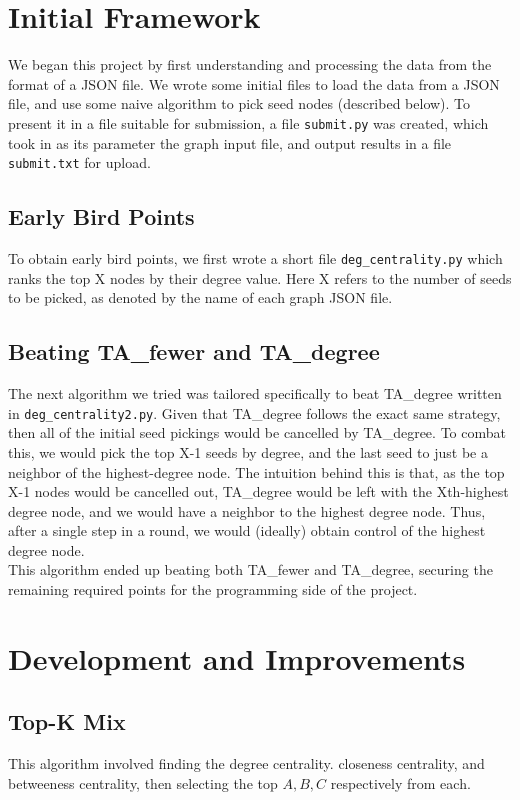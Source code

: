 \documentclass{article}
\begin{document}
\section{Initial Framework}
    We began this project by first understanding and processing the data from the format of a JSON file.
    We wrote some initial files to load the data from a JSON file, and use some naive algorithm to
    pick seed nodes (described below).
    To present it in a file suitable for submission, a file \texttt{submit.py} was 
    created, which took in as its parameter the graph input file, and output results in a file
    \texttt{submit.txt} for upload.
    
    \subsection*{Early Bird Points} 
    To obtain early bird points, we first wrote a short file \texttt{deg\_centrality.py} which
    ranks the top X nodes by their degree value. Here X refers to the number of seeds
    to be picked, as denoted by the name of each graph JSON file. 
    
    \subsection*{Beating TA\_fewer and TA\_degree}
    The next algorithm we tried was tailored specifically to beat TA\_degree
    written in \texttt{deg\_centrality2.py}. Given that
    TA\_degree follows the exact same strategy, then all of the initial seed pickings
    would be cancelled by TA\_degree. To combat this, we would pick the top X-1 seeds by degree,
    and the last seed to just be a neighbor of the highest-degree node. The intuition 
    behind this is that, as the top X-1 nodes would be cancelled out, TA\_degree would be 
    left with the Xth-highest degree node, and we would have a neighbor to the 
    highest degree node. Thus, after a single step in a round, we would (ideally) obtain
    control of the highest degree node. 
    \\
    This algorithm ended up beating both TA\_fewer and TA\_degree, securing the remaining
    required points for the programming side of the project. 
     

\section{Development and Improvements}

\subsection*{Top-K Mix}
This algorithm involved finding the degree centrality. closeness centrality, and betweeness centrality, then selecting the top $A, B, C$ respectively from each. 
\end{document}
